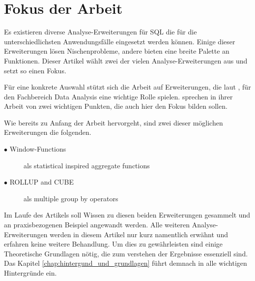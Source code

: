 \section{Fokus der Arbeit}
\label{sec:fokus_der_arbeit} Es existieren diverse Analyse-Erweiterungen für SQL
die für die unterschiedlichsten Anwendungsfälle eingesetzt werden können. Einige
dieser Erweiterungen lösen Nischenprobleme, andere bieten eine breite Palette an
Funktionen. Dieser Artikel wählt zwei der vielen Analyse-Erweiterungen aus und
setzt so einen Fokus.

Für eine konkrete Auswahl stützt sich die Arbeit auf Erweiterungen, die laut \citet[Kapitel3]{FOTACHE2015243},
für den Fachbereich Data Analysis eine wichtige Rolle spielen. \citet[Kapitel 3]{FOTACHE2015243}
sprechen in ihrer Arbeit von zwei wichtigen Punkten, die auch hier den Fokus
bilden sollen.

Wie bereits zu Anfang der Arbeit hervorgeht, sind zwei dieser möglichen Erweiterungen
die folgenden.

\begin{description}
	\item[$\bullet$ Window-Functions] als statistical inspired aggregate functions
		\\ \citep[vgl.][Kapitel 4.3]{FOTACHE2015243}

	\item[$\bullet$ ROLLUP and CUBE] als multiple group by operators \\ \citep[vgl.][Kapitel4.3]{FOTACHE2015243}
\end{description}

Im Laufe des Artikels soll Wissen zu diesen beiden Erweiterungen gesammelt und
an praxisbezogenen Beispiel angewandt werden. Alle weiteren Analyse-Erweiterungen
werden in diesem Artikel nur kurz namentlich erwähnt und erfahren keine weitere Behandlung.
Um dies zu gewährleisten sind einige Theoretische Grundlagen nötig, die zum verstehen
der Ergebnisse essenziell sind. Das Kapitel \ref{chap:hintergund_und_grundlagen}
führt demnach in alle wichtigen Hintergründe ein.
